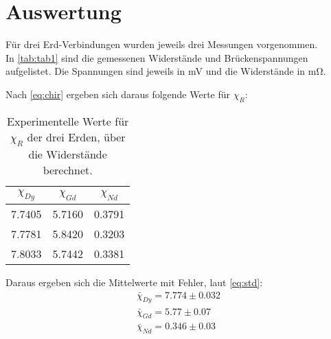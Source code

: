 \section{Auswertung}
\label{sec:Auswertung}

Für drei Erd-Verbindungen wurden jeweils drei Messungen vorgenommen.\\
In \autoref{tab:tab1} sind die gemessenen Widerstände und Brückenspannungen aufgelistet.
Die Spannungen sind jeweils in \si{\milli\volt} und die Widerstände in \si{\milli\ohm}.

\begin{table}
  \centering
  \caption{Messdaten der drei seltenen Erden.}
  \label{tab:tab1}
\end{table}

Nach \autoref{eq:chir} ergeben sich daraus folgende Werte für $\chi_R$:
\begin{table}
  \centering
  \caption{Experimentelle Werte für $\chi_R$ der drei Erden, über die Widerstände berechnet.}
  \label{tab:tab2}
  \begin{tabular}{c|c|c}
    $\chi_{Dy}$ & $\chi_{Gd}$ & $\chi_{Nd}$\\
    \midrule
    7.7405 & 5.7160 & 0.3791\\
    7.7781 & 5.8420 & 0.3203\\
    7.8033 & 5.7442 & 0.3381\\
  \end{tabular}
\end{table}

Daraus ergeben sich die Mittelwerte mit Fehler, laut \autoref{eq:std}:
\begin{align*}
  \bar{\chi}_{Dy} = 7.774\pm 0.032\\
  \bar{\chi}_{Gd} = 5.77\pm 0.07\\
  \bar{\chi}_{Nd} = 0.346\pm 0.03
\end{align*}

